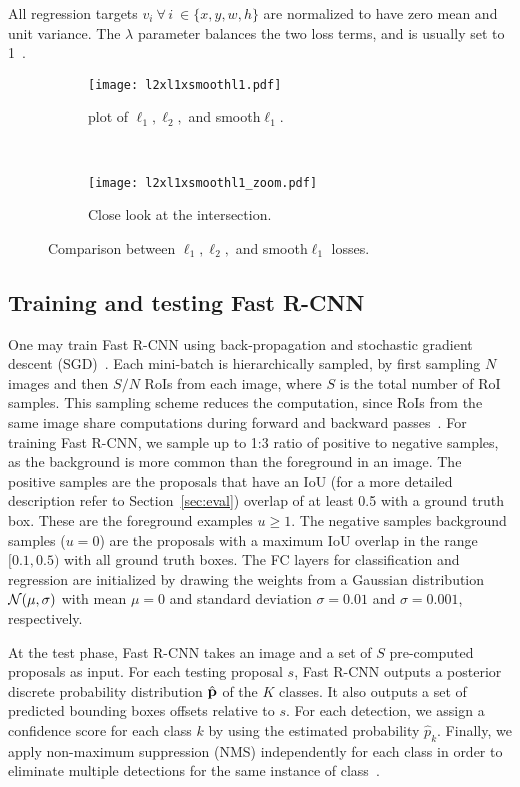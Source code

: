 All regression targets $v_i~\forall\, i \ \in \{x,y,w,h\}$ are normalized to have zero mean and unit variance.
The $\lambda$ parameter balances the two loss terms, and is usually set to 1~\cite{Girshick2015}.
%
\begin{figure}[th!]
  \centering
  \begin{subfigure}[t]{0.49\linewidth}
    \centering
    \texttt{[image: l2xl1xsmoothl1.pdf]}
    \caption{plot of $\ell_1, \ell_2,$ and smooth$\ell_1$.}
  \end{subfigure}~
  \begin{subfigure}[t]{0.49\linewidth}
    \centering
    \texttt{[image: l2xl1xsmoothl1\_zoom.pdf]}
    \caption{Close look at the intersection.}
  \end{subfigure}
  \caption{Comparison between $\ell_1, \ell_2,$ and smooth$\ell_1$ losses.}
  \label{fig:l1_loss}
\end{figure}

\subsection{Training and testing Fast R-CNN}\label{sec:train_fast_rcnn}
%
One may train Fast R-CNN using back-propagation and stochastic gradient descent (SGD)~\cite{LeCun1989}.
Each mini-batch is hierarchically sampled, by first sampling $N$ images and then $S/N$ RoIs from each image, where $S$ is the total number of RoI samples.
This sampling scheme reduces the computation, since RoIs from the same image share computations during forward and backward passes~\cite{Girshick2015}.
For training Fast R-CNN, we sample up to 1:3 ratio of positive to negative samples, as the background is more common than the foreground in an image.
The positive samples are the proposals that have an IoU (for a more detailed description refer to Section~\ref{sec:eval}) overlap of at least 0.5 with a ground truth box.
These are the foreground examples \ie $u\geq1$.
The negative samples \ie background samples ($u=0$) are the proposals with a maximum IoU overlap in the range $[0.1, 0.5)$ with all ground truth boxes.
The FC layers for classification and regression are initialized by drawing the weights from a Gaussian distribution $\mathcal{N}(\mu, \sigma)$ with mean $\mu=0$ and standard deviation $\sigma=0.01$ and $\sigma=0.001$, respectively.

At the test phase, Fast R-CNN takes an image and a set of $S$ pre-computed proposals as input.
For each testing proposal $s$, Fast R-CNN outputs a posterior discrete probability distribution $\hat {\mathbf{p}}$ of the $K$ classes.
It also outputs a set of predicted bounding boxes offsets relative to $s$.
For each detection, we assign a confidence score for each class $k$ by using the estimated probability $\hat p_k$.
Finally, we apply non-maximum suppression (NMS)
independently for each class in order to eliminate multiple detections for the same instance of class~\cite{Girshick2016RCNN}.

